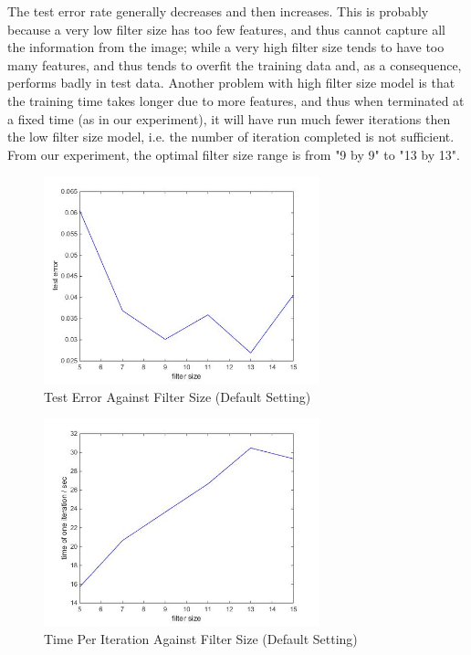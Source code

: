 \documentclass[10pt,twocolumn]{article}
\begin{document}
The test error rate generally decreases and then increases. This is probably because a very low filter size has too few features, and thus cannot capture all the information from the image; while a very high filter size tends to have too many features, and thus tends to overfit the training data and, as a consequence, performs badly in test data. Another problem with high filter size model is that the training time takes longer due to more features, and thus when terminated at a fixed time (as in our experiment), it will have run much fewer iterations then the low filter size model, i.e. the number of iteration completed is not sufficient. From our experiment, the optimal filter size range is from "9 by 9" to "13 by 13".

\begin{figure}

\includegraphics[width = 8cm]{figure/test_error_vs_filter_size}
\caption{Test Error Against Filter Size (Default Setting)}
\label{fig:test_error_vs_filter_size}
\end{figure}

\begin{figure}

\includegraphics[width = 8cm]{figure/iter_time_vs_filter_size}
\caption{Time Per Iteration Against Filter Size (Default Setting)}
\label{fig:iter_time_vs_filter_size}
\end{figure}
\end{document}
